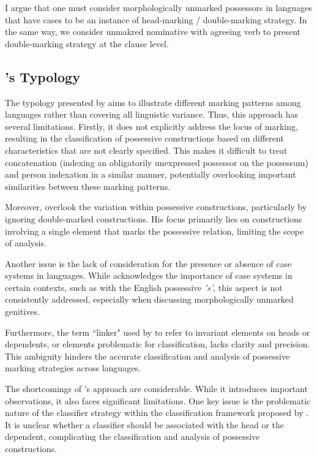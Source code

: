 I argue that one must consider morphologically unmarked possessors in languages that have cases to be an instance of head-marking / double-marking strategy. In the same way, we consider unmakred nominative with agreeing verb to present double-marking strategy at the clause level.


\subsection{\citeauthor{croft2002typology}'s \citeyear{croft2002typology} Typology}

The typology presented by \cite{croft2002typology} aims to illustrate different marking patterns among languages rather than covering all linguistic variance. Thus, this approach has several limitations. Firstly, it does not explicitly address the locus of marking, resulting in the classification of possessive constructions based on different characteristics that are not clearly specified. This makes it difficult to treat concatenation (indexing an obligatorily unexpressed possessor on the possessum) and person indexation in a similar manner, potentially overlooking important similarities between these marking patterns.

Moreover, \cite{croft2002typology} overlook the variation within possessive constructions, particularly by ignoring double-marked constructions. His focus primarily lies on constructions involving a single element that marks the possessive relation, limiting the scope of analysis.

Another issue is the lack of consideration for the presence or absence of case systems in languages. While \cite{croft2002typology} acknowledges the importance of case systems in certain contexts, such as with the English possessive \textit{'s'}, this aspect is not consistently addressed, especially when discussing morphologically unmarked genitives.

Furthermore, the term ``linker" used by \cite{croft2002typology} to refer to invariant elements on heads or dependents, or elements problematic for classification, lacks clarity and precision. This ambiguity hinders the accurate classification and analysis of possessive marking strategies across languages.

The shortcomings of \citeauthor{croft2002typology}'s \citeyear{croft2002typology} approach are considerable. While it introduces important observations, it also faces significant limitations. One key issue is the problematic nature of the classifier strategy within the classification framework proposed by \cite{nichols_locus_2013}. It is unclear whether a classifier should be associated with the head or the dependent, complicating the classification and analysis of possessive constructions.


